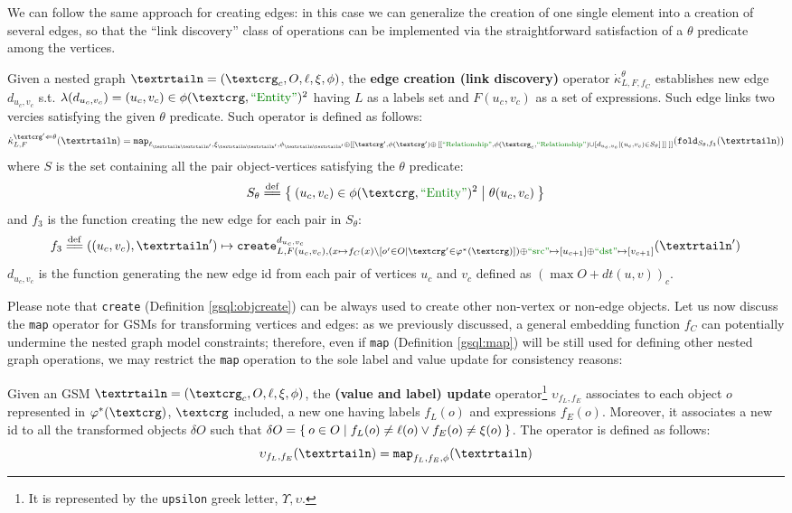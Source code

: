 We can follow the same approach for creating edges: in this case we can generalize the creation of one single element into a creation of several edges, so that the ``link discovery'' class of operations can be implemented \cite{markus} via the straightforward satisfaction of a $\theta$ predicate among the vertices.

\begin{definition}
	Given a nested graph $\nested=(\ngraph_c,O,\ell,\xi,\phi)$, the \textbf{edge creation (link discovery)} operator $\dot\kappa^\theta_{L,F,f_C}$ establishes new edge  $d_{u_c,v_c}$ s.t. $\lambda(d_{u_c,v_c})=(u_c,v_c)\in\phi(\ngraph,\ONTA)^2$ having $L$ as a labels set and $F(u_c,v_c)$ as a set of expressions. Such edge links two vercies satisfying the given $\theta$ predicate. Such operator is defined as follows:
	\[\dot\kappa^{\ngraph'\Leftarrow\theta}_{L,F}(\nested)=\texttt{map}_{\ell_{\nested\nested'},\xi_{\nested\nested'},\phi_{\nested\nested'}\oplus [[\ngraph', \phi(\ngraph')\oplus\,[[\RELA, \phi(\ngraph_c,\RELA)\cup[d_{u_c,v_c}|(u_c,v_c)\in S_\theta]\,]] \;]]}(\texttt{fold}_{S_\theta,f_3}(\nested))\]
	where $S$ is the set containing all the pair object-vertices satisfying the $\theta$ predicate:
	\[S_\theta\eqdef\Set{(u_c,v_c)\in\phi(\ngraph,\ONTA)^2|\theta(u_c,v_c)}\]
	and $f_3$ is the function creating the new edge for each pair in $S_\theta$:
	\[f_3\eqdef((u_c,v_c),\nested')\mapsto\texttt{create}^{d_{u_c,v_c}}_{L,F(u_c,v_c), (x\mapsto f_C(x)\backslash[o'\in O|\ngraph'\in\varphi^*(\ngraph)])\oplus\SRC\mapsto [u_{c+1}]\oplus \DST\mapsto [v_{c+1}]}(\nested')\]
	$d_{u_c,v_c}$ is the function generating the new edge id from each pair of vertices $u_c$ and $v_c$ defined as $(\max O+dt(u,v))_{c}$.  
\end{definition}

Please note that  \texttt{create} (Definition \vref{gsql:objcreate}) can be always used to create other non-vertex or non-edge objects. 
Let us now discuss the \texttt{map} operator for GSMs  for transforming vertices and edges: as we previously discussed, a general embedding function $f_C$  can potentially undermine the nested graph model constraints; therefore, even if \texttt{map} (Definition \vref{gsql:map}) will be still used for defining other nested graph operations,   we may restrict the \texttt{map} operation to the sole label and value update for consistency reasons:

\begin{definition}	
	Given an GSM $\fullnested[][\ngraph_{c}]$, the \textbf{(value and label) update} operator\footnote{It is represented by the \texttt{upsilon} greek letter, $\Upsilon,\upsilon$.} $\upsilon_{f_L,f_E}$ associates to each object $o$ represented in $\varphi^*(\ngraph)$, $\ngraph$ included, a new one having labels $f_L(o)$ and expressions $f_E(o)$. Moreover, it associates a new id to all the transformed objects $\delta O$ such that $\delta O=\Set{o\in O|f_L(o)\neq \ell(o)\vee f_E(o)\neq \xi(o)}$. The operator is defined as follows:
	\[\upsilon_{f_L,f_E}(\nested)=\texttt{map}_{f_L,f_E,\phi}(\nested)\]
\end{definition} 

